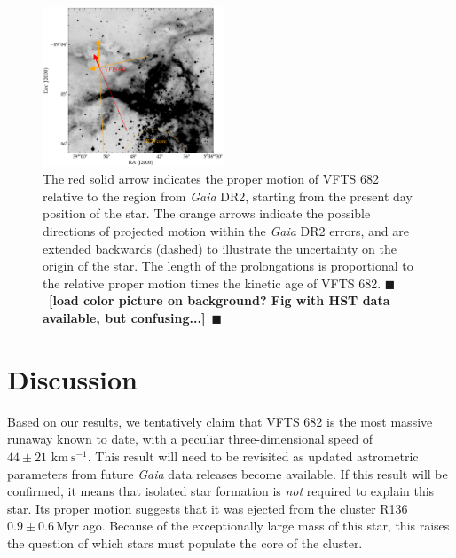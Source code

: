 \documentclass[apjl,twocolumn]{emulateapj}
\newcommand{\todo}[1]{{\large $\blacksquare$~\textbf{\color{red}[#1]}}~$\blacksquare$}
\newcommand{\kms}{{\,\mathrm{km\ s^{-1}}}}
\begin{document}
\begin{figure}[tbp]
  \centering
  \includegraphics[width=0.48\textwidth]{./figures/main_plot_good_gaia_only}  
  \caption{The red solid arrow indicates the proper motion of VFTS 682
    relative to the region from \emph{Gaia} DR2, starting from the present day position of
    the star. The orange arrows indicate the possible
    directions of projected motion within the \emph{Gaia} DR2 errors, and are extended
    backwards (dashed) to illustrate the uncertainty on the origin of the
    star. The length of the prolongations is proportional to the relative proper motion
    times the kinetic age of VFTS 682. \todo{load color picture on background? Fig with HST data
      available, but confusing...}}
  
  \label{fig:main}
\end{figure}


\section{Discussion}
\label{sec:discussion}

Based on our results, we tentatively claim that VFTS 682 is the most massive
runaway known to date, with a peculiar three-dimensional speed of
$44\pm21\,\kms$. This result will need to be revisited as updated
astrometric parameters from future \emph{Gaia} data releases become
available. If this result will be confirmed, it means that isolated star formation is
\emph{not} required to explain this star. Its proper motion suggests that it was ejected from the cluster R136
$0.9\pm0.6$\,Myr ago. Because of the exceptionally large mass
of this star, this raises the question of which stars must populate
the core of the cluster.
\end{document}
